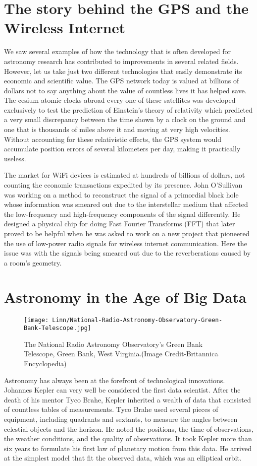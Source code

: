 \documentclass{../template/texnote}
\begin{document}
\section{The story behind the GPS and the Wireless Internet}

We saw several examples of how the technology that is often developed for astronomy research has contributed to improvements in several related fields. However, let us take just two different technologies that easily demonstrate its economic and scientific value. The GPS network today is valued at billions of dollars not to say anything about the value of countless lives it has helped save. The cesium atomic clocks abroad every one of these satellites was developed exclusively to test the prediction of Einstein's  theory of relativity which predicted a very small discrepancy between the time shown by a clock on the ground and one that is thousands of miles above it and moving at very high velocities. Without accounting for these relativistic effects, the GPS system would accumulate position errors of several kilometers per day, making it practically useless.

The market for WiFi devices is estimated at hundreds of billions of dollars, not counting the economic transactions expedited by its presence. John O'Sullivan was working on a method to reconstruct the signal of a primordial black hole whose information was smeared out due to the interstellar medium that affected the low-frequency and high-frequency components of the signal differently. He designed a physical chip for doing Fast Fourier Transforms (FFT) that later proved to be helpful when he was asked to work on a new project that pioneered the use of low-power radio signals for wireless internet communication.  Here the issue was with the signals being smeared out due to the reverberations caused by a room's geometry.
\section{Astronomy in the Age of Big Data}

\begin{figure}
    \centering
    \texttt{[image: Linn/National-Radio-Astronomy-Observatory-Green-Bank-Telescope.jpg]}
    \caption{The National Radio Astronomy Observatory's Green Bank Telescope, Green Bank, West Virginia.(Image Credit-Britannica Encyclopedia)}
    \label{fig:radiotelescope}
\end{figure}

Astronomy has always been at the forefront of technological innovations. Johannes Kepler can very well be considered the first data scientist. After the death of his mentor Tyco Brahe, Kepler inherited a wealth of data that consisted of countless tables of measurements. Tyco Brahe used several pieces of equipment, including quadrants and sextants, to measure the angles between celestial objects and the horizon. He noted the positions, the time of observations, the weather conditions, and the quality of observations. It took Kepler more than six years to formulate his first law of planetary motion from this data. He arrived at the simplest model that fit the observed data, which was an elliptical orbit. 
\end{document}
